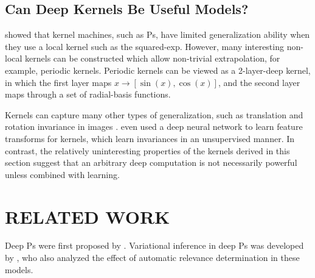 \documentclass[twoside]{article}
\makeatletter
\newlength{\nonHumbleHeight}
\def\@humbleformat#1{{\settoheight{\nonHumbleHeight}{#1}\resizebox{!}{0.94\nonHumbleHeight}{#1}}}%
\def\humble#1{\@humbleformat{#1}}%
\newcommand{\gp}{{\humble GP}}
\newcommand{\sectiondist}{}
\makeatother
\begin{document}
\subsection{Can Deep Kernels Be Useful Models?}
\sectiondist

\cite{NIPS2005_424} showed that kernel machines, such as \gp{}s, have limited generalization ability when they use a local kernel such as the squared-exp.  However, many interesting non-local kernels can be constructed which allow non-trivial extrapolation, for example, periodic kernels. Periodic kernels can be viewed as a 2-layer-deep kernel, in which the first layer maps $x \rightarrow [\sin(x), \cos(x)]$, and the second layer maps through a set of radial-basis functions.  

Kernels can capture many other types of generalization, such as translation and rotation invariance in images \citep{kondor2008group}.  \cite{SalHin08} even used a deep neural network to learn feature transforms for kernels, which learn invariances in an unsupervised manner.  
%
In contrast, the relatively uninteresting properties of the kernels derived in this section suggest that an arbitrary deep computation is not necessarily powerful unless combined with learning.%



\section{RELATED WORK}
\sectiondist

Deep \gp{}s were first proposed by \cite{lawrence2007hierarchical}. Variational inference in deep \gp{}s was developed by \cite{damianou2012deep}, who also analyzed the effect of automatic relevance determination in these models.
%
%
\end{document}
